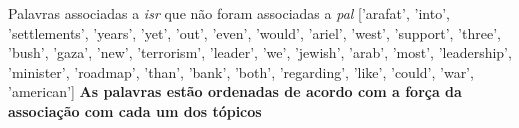 Palavras associadas a \emph{isr} que não foram associadas a \emph{pal}
['arafat', 'into', 'settlements', 'years', 'yet', 'out', 'even', 'would', 'ariel', 'west', 'support', 'three', 'bush', 'gaza', 'new', 'terrorism', 'leader', 'we', 'jewish', 'arab', 'most', 'leadership', 'minister', 'roadmap', 'than', 'bank', 'both', 'regarding', 'like', 'could', 'war', 'american']
\textbf{As palavras estão ordenadas de acordo com a força da associação com cada um dos tópicos}






